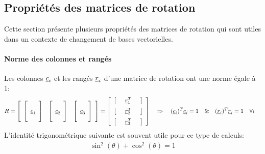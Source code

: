 \subsection{Propriétés des matrices de rotation}

Cette section présente plusieurs propriétés des matrices de rotation qui sont utiles dans un contexte de changement de bases vectorielles.

\paragraph{Norme des colonnes et rangés}

Les colonnes $\underline{c}_i$ et les rangés $\underline{r}_i$ d'une matrice de rotation ont une norme égale à 1:
\begin{align}
R &= 
\left[ \begin{array}{c c c} 
	\left[ \begin{array}{c} \\ \underline{c}_1 \\  \\ \end{array}  \right] & \left[ \begin{array}{c} \\ \underline{c}_2 \\  \\ \end{array}  \right] & \left[ \begin{array}{c} \\ \underline{c}_3 \\  \\ \end{array}  \right]
\end{array} \right]
=
\left[ \begin{array}{c} 
\left[ \begin{array}{c c c} & \underline{r}_1^T & \end{array} \right] \\[\medskipamount]
\left[ \begin{array}{c c c} & \underline{r}_2^T & \end{array} \right] \\[\medskipamount]
\left[ \begin{array}{c c c} & \underline{r}_3^T & \end{array} \right] 
\end{array} \right] 
\quad \Rightarrow \quad
(\underline{c}_i)^T \underline{c}_i = 1 \quad \& \quad (\underline{r}_i)^T \underline{r}_i = 1  \quad \forall i 
\end{align}
L’identité trigonométrique suivante est souvent utile pour ce type de calculs:
\begin{align}
\sin^2(\theta) + \cos^2(\theta) = 1
\end{align}

